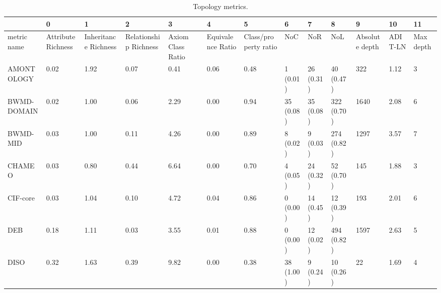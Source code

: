 \begin{table}
\centering
\caption{Topology metrics.}
\label{tab:topology-metrics}
\begin{tabular}{m{3.5cm}m{2cm}m{2cm}m{2cm}m{2cm}m{2cm}m{2cm}m{2cm}m{2cm}m{2cm}m{2cm}m{2cm}m{2cm}}
\toprule
{} &                  0  &                    1  &                     2  &                 3  &                 4  &                    5  &             6  &          7  &           8  &              9  &       10 &         11 \\
\midrule
metric name             &  Attribute Richness &  Inheritance Richness &  Relationship Richness &  Axiom Class Ratio &  Equivalence Ratio &  Class/property ratio &            NoC &         NoR &          NoL &  Absolute depth &  ADIT-LN &  Max depth \\
AMONTOLOGY              &                0.02 &                  1.92 &                   0.07 &               0.41 &               0.06 &                  0.48 &       1 (0.01) &   26 (0.31) &    40 (0.47) &             322 &     1.12 &          3 \\
BWMD-DOMAIN             &                0.02 &                  1.00 &                   0.06 &               2.29 &               0.00 &                  0.94 &      35 (0.08) &   35 (0.08) &   322 (0.70) &            1640 &     2.08 &          6 \\
BWMD-MID                &                0.03 &                  1.00 &                   0.11 &               4.26 &               0.00 &                  0.89 &       8 (0.02) &    9 (0.03) &   274 (0.82) &            1297 &     3.57 &          7 \\
CHAMEO                  &                0.03 &                  0.80 &                   0.44 &               6.64 &               0.00 &                  0.70 &       4 (0.05) &   24 (0.32) &    52 (0.70) &             145 &     1.88 &          3 \\
CIF-core                &                0.03 &                  1.04 &                   0.10 &               4.72 &               0.04 &                  0.86 &       0 (0.00) &   14 (0.45) &    12 (0.39) &             193 &     2.01 &          6 \\
DEB                     &                0.18 &                  1.11 &                   0.03 &               3.55 &               0.01 &                  0.88 &       0 (0.00) &   12 (0.02) &   494 (0.82) &            1597 &     2.63 &          5 \\
DISO                    &                0.32 &                  1.63 &                   0.39 &               9.82 &               0.00 &                  0.38 &      38 (1.00) &    9 (0.24) &    10 (0.26) &              22 &     1.69 &          4 \\

\end{tabular}
\end{table}
